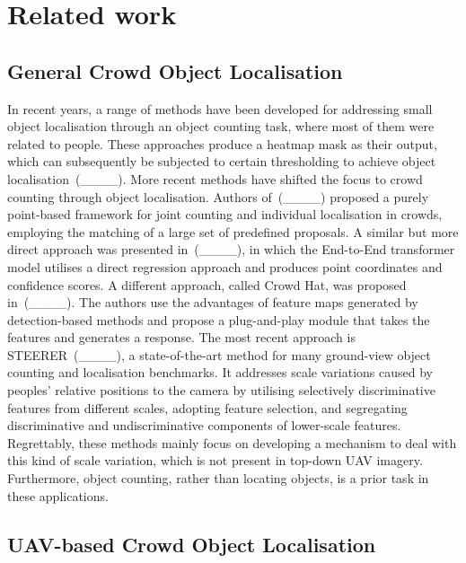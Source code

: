 \section{Related work}
\label{sec:Related_work}

\subsection{General Crowd Object Localisation}

In recent years, a range of methods have been developed for addressing small object localisation through an object counting task, where most of them were related to people. These approaches produce a heatmap mask as their output, which can subsequently be subjected to certain thresholding to achieve object localisation~(____). More recent methods have shifted the focus to crowd counting through object localisation. Authors of~(____) proposed a purely point-based framework for joint counting and individual localisation in crowds, employing the matching of a large set of predefined proposals. A similar but more direct approach was presented in~(____), in which the End-to-End transformer model utilises a direct regression approach and produces point coordinates and confidence scores. A different approach, called Crowd Hat, was proposed in~(____). The authors use the advantages of feature maps generated by detection-based methods and propose a plug-and-play module that takes the features and generates a response. The most recent approach is STEERER~(____), a state-of-the-art method for many ground-view object counting and localisation benchmarks. It addresses scale variations caused by peoples' relative positions to the camera by utilising selectively discriminative features from different scales, adopting feature selection, and segregating discriminative and undiscriminative components of lower-scale features. Regrettably, these methods mainly focus on developing a mechanism to deal with this kind of scale variation, which is not present in top-down UAV imagery. Furthermore, object counting, rather than locating objects, is a prior task in these applications.

\subsection{UAV-based Crowd Object Localisation}

